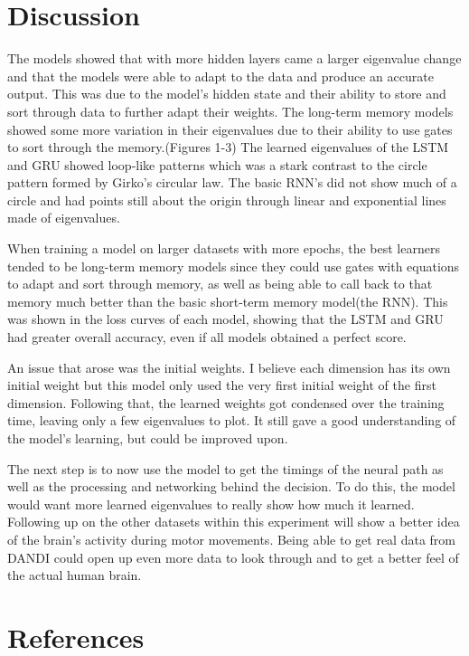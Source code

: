 \documentclass{article}
\begin{document}
\section{Discussion\centering}
The models showed that with more hidden layers came a larger eigenvalue change and that the models were able to adapt to the data and produce an accurate output. This was due to the model's hidden state and their ability to store and sort through data to further adapt their weights. The long-term memory models showed some more variation in their eigenvalues due to their ability to use gates to sort through the memory.(Figures 1-3) The learned eigenvalues of the LSTM and GRU showed loop-like patterns which was a stark contrast to the circle pattern formed by Girko's circular law. The basic RNN's did not show much of a circle and had points still about the origin through linear and exponential lines made of eigenvalues.
\par\noindent{}
When training a model on larger datasets with more epochs, the best learners tended to be long-term memory models since they could use gates with equations to adapt and sort through memory, as well as being able to call back to that memory much better than the basic short-term memory model(the RNN). This was shown in the loss curves of each model, showing that the LSTM and GRU had greater overall accuracy, even if all models obtained a perfect score.
\par\noindent{}
An issue that arose was the initial weights. I believe each dimension has its own initial weight but this model only used the very first initial weight of the first dimension. Following that, the learned weights got condensed over the training time, leaving only a few eigenvalues to plot. It still gave a good understanding of the model's learning, but could be improved upon. \par\noindent{}
The next step is to now use the model to get the timings of the neural path as well as the processing and networking behind the decision. To do this, the model would want more learned eigenvalues to really show how much it learned. Following up on the other datasets within this experiment\cite{Wang2018} will show a better idea of the brain's activity during motor movements. Being able to get real data from DANDI could open up even more data to look through and to get a better feel of the actual human brain.

\section{References\centering}
\printbibliography
\end{document}
